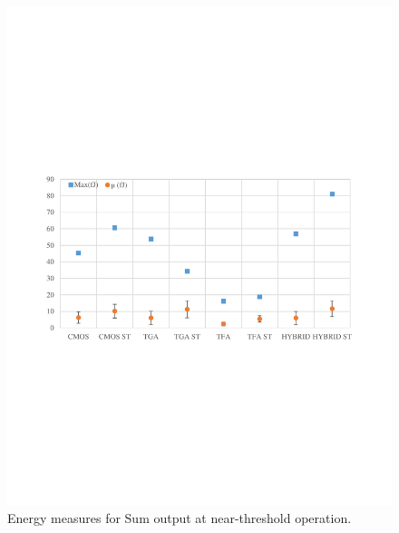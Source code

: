 \documentclass[ecp,tc, english]{iiufrgs}
\begin{document}
\begin{figure}[H]
\centering
\includegraphics[width=\textwidth, trim={0 9cm 0 9cm},clip]{energyNTSum.pdf}
\caption{Energy measures for Sum output at near-threshold operation.}
\label{fig:Fig49}
\end{figure}
\end{document}
